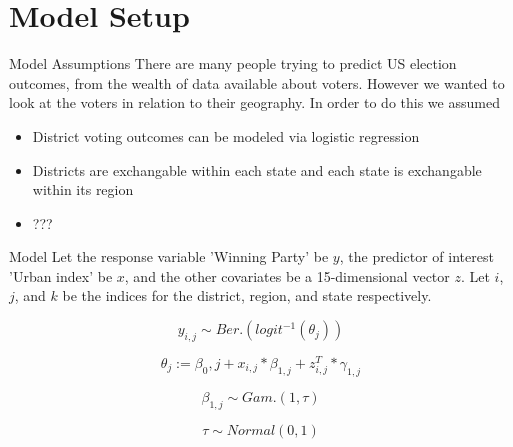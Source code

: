 \documentclass{beamer}
\begin{document}




\section{Model Setup}
\begin{frame}{Model Assumptions}
  There are many people trying to predict US election outcomes, from the wealth of data available about voters. However we wanted to look at the voters in relation to their geography. In order to do this we assumed 
  \begin{itemize}
    \item District voting outcomes can be modeled via logistic regression 
    \item Districts are exchangable within each state and each state is exchangable within its region
    \item ??? 
  \end{itemize}
  \end{frame}

\begin{frame}{Model}
Let the response variable 'Winning Party' be \(y\), the predictor of interest 'Urban index' be \(x\), and the other covariates be a 15-dimensional vector \(z\). Let \(i\), \(j\), and \(k\) be the indices for the district, region, and state respectively. 

\[y_{i, j} \sim Ber.(logit^{-1}(\theta_{j}))\]

\[\theta_j := \beta_0, j + x_{i,j} * \beta_{1,j}  + z_{i, j}^T * \gamma_{1,j}\]

\[\beta_{1,j} \sim Gam.(1, \tau)\]

\[\tau \sim Normal(0, 1) \]  %


\end{frame}
\end{document}
